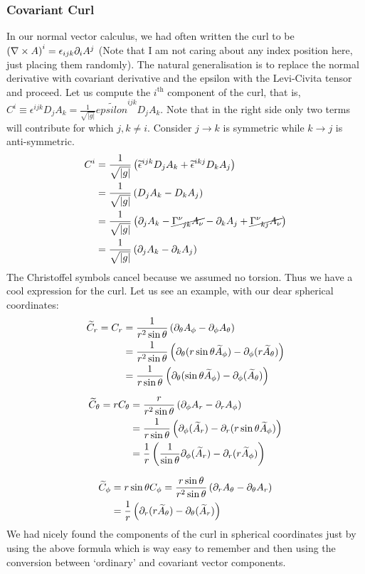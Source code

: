 \subsubsection{Covariant Curl}
In our normal vector calculus, we had often written the curl to be $\left( \nabla\times A \right)^i = \epsilon_{ijk}\partial_i A^j$ (Note that I am not caring about any index position here, just placing them randomly). The natural generalisation is to replace the normal derivative with covariant derivative and the epsilon with the Levi-Civita tensor and proceed. Let us compute the $i^{\text{th}}$ component of the curl, that is, $C^i \equiv \epsilon^{ijk}D_j A_k =\frac{1}{\sqrt{|g|}}\widetilde{epsilon}^{ijk}D_j A_k $. Note that in the right side only two terms will contribute for which $j,k \neq i$. Consider $j\rightarrow k$ is symmetric while $k\rightarrow j$ is anti-symmetric. 
\begin{align*}
    C^i &= \frac{1}{\sqrt{|g|}}\brac{\widetilde{\epsilon}^{ijk}D_j A_k+\widetilde{\epsilon}^{ikj}D_k A_j }\\
    &=\frac{1}{\sqrt{|g|}}\brac{D_j A_k-D_k A_j }\\
    &=\frac{1}{\sqrt{|g|}}\brac{\partial_j A_k- \cancel{\tensor{\Gamma}{^\nu _{jk}}A_\nu} -\partial_k A_j + \cancel{\tensor{\Gamma}{^\nu _{kj}}A_\nu}}\\
    &=\frac{1}{\sqrt{|g|}} \brac{\partial_j A_k-\partial_k A_j}
\end{align*}
The Christoffel symbols cancel because we assumed no torsion. Thus we have a cool expression for the curl. Let us see an example, with our dear spherical coordinates:
\begin{align*}
    \widetilde{C}_r = C_r &= \frac{1}{r^2\sin \theta}\left( \partial_\theta A_\phi - \partial_\phi A_\theta \right)\\
    &=\frac{1}{r^2\sin \theta}\left( \partial_\theta (r\sin\theta \widetilde{A}_\phi) - \partial_\phi (r\widetilde{A}_\theta) \right)\\
    &=\frac{1}{r\sin \theta}\left( \partial_\theta (\sin\theta \widetilde{A}_\phi) - \partial_\phi (\widetilde{A}_\theta) \right)
\end{align*}

\begin{align*}
    \widetilde{C}_\theta = rC_\theta &= \frac{r}{r^2\sin \theta}\left( \partial_\phi A_r - \partial_r A_\phi \right)\\
    &=\frac{1}{r\sin \theta}\left( \partial_\phi (\widetilde{A}_r) - \partial_r (r\sin\theta\widetilde{A}_\phi) \right)\\
    &=\frac{1}{r}\left( \frac{1}{\sin \theta}\partial_\phi (\widetilde{A}_r) - \partial_r (r\widetilde{A}_\phi) \right)
\end{align*}

\begin{align*}
    \widetilde{C}_\phi &= r\sin\theta C_\phi = \frac{r\sin\theta}{r^2\sin \theta}\left( \partial_r A_\theta- \partial_\theta A_r \right)\\
    &=\frac{1}{r}\left( \partial_r (r\widetilde{A}_\theta) - \partial_\theta (\widetilde{A}_r) \right)
\end{align*}
We had nicely found the components of the curl in spherical coordinates just by using the above formula which is way easy to remember and then using the conversion between `ordinary' and covariant vector components. 